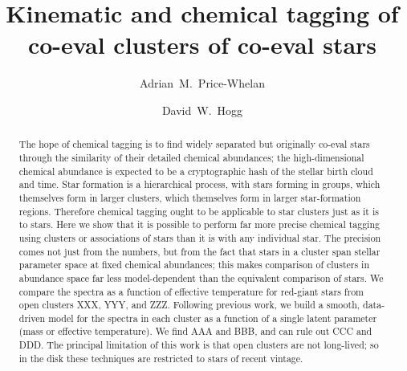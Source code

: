 \documentclass[modern, letterpaper]{aastex61}
\begin{document}
\sloppy\sloppypar\raggedbottom\frenchspacing %

\title{Kinematic and chemical tagging of co-eval clusters of co-eval stars}

\author{Adrian~M.~Price-Whelan}

\author{David~W.~Hogg}

\begin{abstract}
The hope of chemical tagging is to find widely separated but originally
co-eval stars through the similarity of their detailed chemical abundances;
the high-dimensional chemical abundance is expected to be a cryptographic
hash of the stellar birth cloud and time.
Star formation is a hierarchical process, with stars forming in
groups, which themselves form in larger clusters, which themselves
form in larger star-formation regions.
Therefore chemical tagging ought to be applicable to star clusters
just as it is to stars.
Here we show that it is possible to perform far more precise chemical
tagging using clusters or associations of stars than it is with any
individual star.
The precision comes not just from the numbers, but from the fact that
stars in a cluster span stellar parameter space at fixed chemical
abundances; this makes comparison of clusters in abundance space far
less model-dependent than the equivalent comparison of stars.
We compare the spectra as a function of effective temperature for
red-giant stars from open clusters XXX, YYY, and ZZZ.
Following previous work, we build a smooth, data-driven model for the
spectra in each cluster as a function of a single latent parameter
(mass or effective temperature).
We find AAA and BBB, and can rule out CCC and DDD.
The principal limitation of this work is that open clusters are not
long-lived; so in the disk these techniques are restricted to stars of
recent vintage.
\end{abstract}
\end{document}
